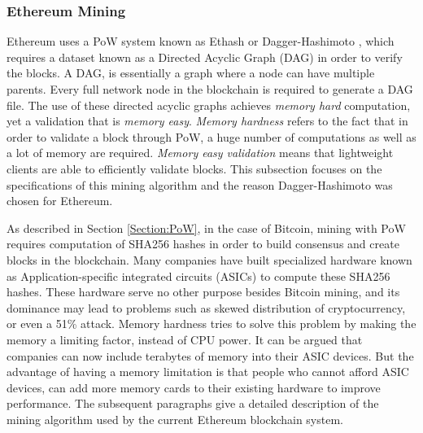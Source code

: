 \documentclass[english]{tktltiki}
\begin{document}
\subsubsection{Ethereum Mining} \label{Section:Ethereum_Mining}
Ethereum uses a PoW system known as Ethash or Dagger-Hashimoto \cite{dagger-hashimoto}, which requires a dataset known as a Directed Acyclic Graph (DAG) \cite{bayesian-networks} in order to verify the blocks. A DAG, is essentially a graph where a node can have multiple parents. Every full network node in the blockchain is required to generate a DAG file. The use of these directed acyclic graphs achieves \textit{memory hard} computation, yet a validation that is \textit{memory easy}. \textit{Memory hardness} \cite{dagger} refers to the fact that in order to validate a block through PoW, a huge number of computations as well as a lot of memory are required. \textit{Memory easy validation} means that lightweight clients are able to efficiently validate blocks. This subsection focuses on the specifications of this mining algorithm and the reason Dagger-Hashimoto was chosen for Ethereum.

As described in Section \ref{Section:PoW}, in the case of Bitcoin, mining with PoW requires computation of SHA256 hashes in order to build consensus and create blocks in the blockchain. Many companies have built specialized hardware known as Application-specific integrated circuits (ASICs) to compute these SHA256 hashes. These hardware serve no other purpose besides Bitcoin mining, and its dominance may lead to problems such as skewed distribution of cryptocurrency, or even a 51\% attack. Memory hardness tries to solve this problem by making the memory a limiting factor, instead of CPU power. It can be argued that companies can now include terabytes of memory into their ASIC devices. But the advantage of having a memory limitation is that people who cannot afford ASIC devices, can add more memory cards to their existing hardware to improve performance. The subsequent paragraphs give a detailed description of the mining algorithm used by the current Ethereum blockchain system.
\end{document}
